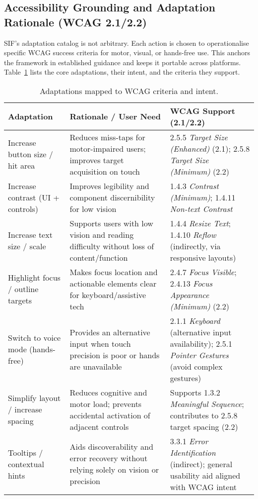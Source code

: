 \subsection{Accessibility Grounding and Adaptation Rationale (WCAG 2.1/2.2)}
SIF’s adaptation catalog is not arbitrary. Each action is chosen to operationalise specific WCAG success criteria for motor, visual, or hands-free use. This anchors the framework in established guidance and keeps it portable across platforms. Table~\ref{tab:wcag-mapping} lists the core adaptations, their intent, and the criteria they support.

\begin{table}[h]
\centering
\small
\caption{Adaptations mapped to WCAG criteria and intent.}
\label{tab:wcag-mapping}
\begin{tabular}{p{3.4cm}p{5.6cm}p{5.2cm}}
\toprule
\textbf{Adaptation} & \textbf{Rationale / User Need} & \textbf{WCAG Support (2.1/2.2)} \\
\midrule
Increase button size / hit area & Reduces miss-taps for motor-impaired users; improves target acquisition on touch & 2.5.5 \emph{Target Size (Enhanced)} (2.1); 2.5.8 \emph{Target Size (Minimum)} (2.2) \\
Increase contrast (UI + controls) & Improves legibility and component discernibility for low vision & 1.4.3 \emph{Contrast (Minimum)}; 1.4.11 \emph{Non-text Contrast} \\
Increase text size / scale & Supports users with low vision and reading difficulty without loss of content/function & 1.4.4 \emph{Resize Text}; 1.4.10 \emph{Reflow} (indirectly, via responsive layouts) \\
Highlight focus / outline targets & Makes focus location and actionable elements clear for keyboard/assistive tech & 2.4.7 \emph{Focus Visible}; 2.4.13 \emph{Focus Appearance (Minimum)} (2.2) \\
Switch to voice mode (hands-free) & Provides an alternative input when touch precision is poor or hands are unavailable & 2.1.1 \emph{Keyboard} (alternative input availability); 2.5.1 \emph{Pointer Gestures} (avoid complex gestures) \\
Simplify layout / increase spacing & Reduces cognitive and motor load; prevents accidental activation of adjacent controls & Supports 1.3.2 \emph{Meaningful Sequence}; contributes to 2.5.8 target spacing (2.2) \\
Tooltips / contextual hints & Aids discoverability and error recovery without relying solely on vision or precision & 3.3.1 \emph{Error Identification} (indirect); general usability aid aligned with WCAG intent \\
\bottomrule
\end{tabular}
\end{table}

